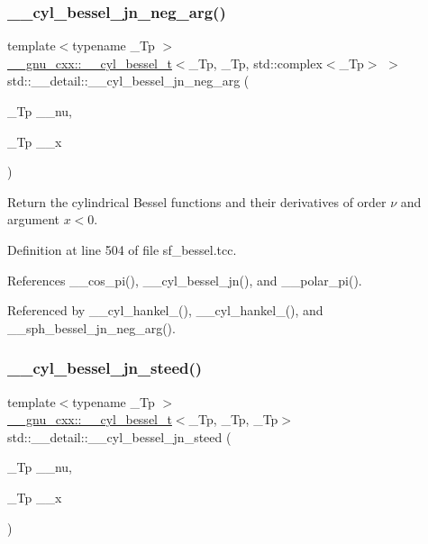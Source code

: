 \subsubsection{\texorpdfstring{\+\_\+\+\_\+cyl\+\_\+bessel\+\_\+jn\+\_\+neg\+\_\+arg()}{\_\_cyl\_bessel\_jn\_neg\_arg()}}
{\footnotesize\ttfamily template$<$typename \+\_\+\+Tp $>$ \\
\hyperlink{struct____gnu__cxx_1_1____cyl__bessel__t}{\+\_\+\+\_\+gnu\+\_\+cxx\+::\+\_\+\+\_\+cyl\+\_\+bessel\+\_\+t}$<$\+\_\+\+Tp, \+\_\+\+Tp, std\+::complex$<$\+\_\+\+Tp$>$ $>$ std\+::\+\_\+\+\_\+detail\+::\+\_\+\+\_\+cyl\+\_\+bessel\+\_\+jn\+\_\+neg\+\_\+arg (\begin{DoxyParamCaption}\item[{\+\_\+\+Tp}]{\+\_\+\+\_\+nu,  }\item[{\+\_\+\+Tp}]{\+\_\+\+\_\+x }\end{DoxyParamCaption})}



Return the cylindrical Bessel functions and their derivatives of order $ \nu $ and argument $ x < 0 $. 



Definition at line 504 of file sf\+\_\+bessel.\+tcc.



References \+\_\+\+\_\+cos\+\_\+pi(), \+\_\+\+\_\+cyl\+\_\+bessel\+\_\+jn(), and \+\_\+\+\_\+polar\+\_\+pi().



Referenced by \+\_\+\+\_\+cyl\+\_\+hankel\+\_(), \+\_\+\+\_\+cyl\+\_\+hankel\+\_(), and \+\_\+\+\_\+sph\+\_\+bessel\+\_\+jn\+\_\+neg\+\_\+arg().

\mbox{\label{namespacestd_1_1____detail_a92e231f659735cf87c67a35f5ac4dd36}} 
\subsubsection{\texorpdfstring{\+\_\+\+\_\+cyl\+\_\+bessel\+\_\+jn\+\_\+steed()}{\_\_cyl\_bessel\_jn\_steed()}}
{\footnotesize\ttfamily template$<$typename \+\_\+\+Tp $>$ \\
\hyperlink{struct____gnu__cxx_1_1____cyl__bessel__t}{\+\_\+\+\_\+gnu\+\_\+cxx\+::\+\_\+\+\_\+cyl\+\_\+bessel\+\_\+t}$<$\+\_\+\+Tp, \+\_\+\+Tp, \+\_\+\+Tp$>$ std\+::\+\_\+\+\_\+detail\+::\+\_\+\+\_\+cyl\+\_\+bessel\+\_\+jn\+\_\+steed (\begin{DoxyParamCaption}\item[{\+\_\+\+Tp}]{\+\_\+\+\_\+nu,  }\item[{\+\_\+\+Tp}]{\+\_\+\+\_\+x }\end{DoxyParamCaption})}



